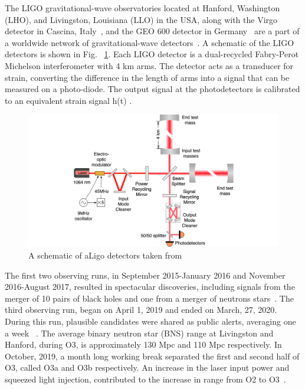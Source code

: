 \documentclass[12pt]{iopart}
\begin{document}
The LIGO  gravitational-wave observatories located at Hanford, Washington (LHO), and Livingston, Louisiana (LLO) in the USA, along with the Virgo detector in Cascina, Italy~\cite{virgo}, and the GEO 600 detector in Germany~\cite{german} are a part of a worldwide network of gravitational-wave detectors~\cite{aligo}. 
A schematic of the LIGO detectors is shown in Fig. ~\ref{fig:schematic}.
Each LIGO detector is a dual-recycled Fabry-Perot Michelson interferometer with 4 km arms. The detector acts as a transducer for strain, converting the difference in the length of arms into a signal that can be measured on a photo-diode. The output signal at the photodetectors is calibrated to an equivalent strain signal h(t) \cite{Abbott_2017,Viets_2018}.
\begin{figure}[h]
    \centering
    \includegraphics[width=12cm]{ligo-schematic.png}
    \caption{A schematic of aLigo detectors taken from {~\cite{schematic}} }
    \label{fig:schematic}
\end{figure}


The first two observing runs, in September 2015-January 2016 and November 2016-August 2017, resulted in spectacular discoveries, including signals from the merger of 10 pairs of black holes and one from a merger of neutrons stars~\cite{catalogue,firstpaper,neturonpaper}. The third observing run, began on April 1, 2019 and ended on March, 27, 2020. During this run, plausible candidates were shared as public alerts, averaging one a week ~\cite{gracedb}. The average binary neutron star (BNS) range at Livingston and Hanford, during O3, is approximately 130 Mpc and 110 Mpc respectively. In October, 2019, a month long working break separated the first and second half of O3, called O3a and O3b respectively. An increase in the laser input power and squeezed light injection, contributed to the increase in range from O2 to O3~\cite{src,prospect}.
\end{document}
